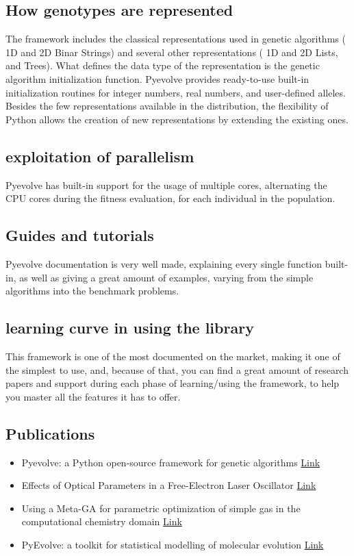 \documentclass{article}
\begin{document}
\subsection{How genotypes are represented}
    The framework includes the classical representations used in genetic algorithms ( 1D and 2D Binar Strings) and several other representations ( 1D and 2D Lists, and Trees). What deﬁnes the data type of the representation is the genetic algorithm initialization function. Pyevolve provides ready-to-use built-in initialization routines for integer numbers, real numbers, and user-deﬁned alleles. Besides the few representations available in the distribution, the ﬂexibility of Python allows the creation of new representations by extending the existing ones.  
\subsection{exploitation of parallelism}
Pyevolve has built-in support for the usage of multiple cores, alternating the CPU cores during the fitness evaluation, for each individual in the population.
\subsection{Guides and tutorials}
Pyevolve documentation is very well made, explaining every single function built-in, as well as giving a great amount of examples, varying from the simple algorithms into the benchmark problems.
\subsection{learning curve in using the library}
This framework is one of the most documented on the market, making it one of the simplest to use, and, because of that, you can find a great amount of research papers and support during each phase of learning/using the framework, to help you master all the features it has to offer.
\subsection{Publications}
\begin{itemize}
    \item  Pyevolve: a Python open-source framework for genetic algorithms \href{}{Link}
    \item Effects of Optical Parameters in a Free-Electron Laser Oscillator \href{https://iopscience.iop.org/article/10.1143/JJAP.49.076401/meta}{Link}
    \item Using a Meta-GA for parametric optimization of simple gas in the computational chemistry domain \href{https://www.researchgate.net/profile/Zoe_Brain/publication/220740459_Using_a_Meta-GA_for_parametric_optimization_of_simple_gas_in_the_computational_chemistry_domain/links/54e5a6bc0cf29865c3375545/Using-a-Meta-GA-for-parametric-optimization-of-simple-gas-in-the-computational-chemistry-domain.pdf}{Link}
    \item PyEvolve: a toolkit for statistical modelling of molecular evolution \href{https://bmcbioinformatics.biomedcentral.com/articles/10.1186/1471-2105-5-1}{Link}
\end{itemize}
\end{document}
